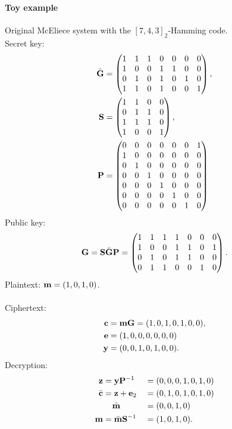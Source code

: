 \documentclass[a4paper, 11pt, openany]{book}
\numberwithin{equation}{section}
\theoremstyle{plain}
\theoremstyle{definition}
\begin{document}
\paragraph{Toy example}
Original McEliece system with the $[7,4,3]_2$-Hamming code.\\
Secret key:
\begin{align*}
	\bar{\bf G} &= \begin{pmatrix}
		1 & 1 & 1 & 0 & 0 & 0 & 0\\
		1 & 0 & 0 & 1 & 1 & 0 & 0\\
		0 & 1 & 0 & 1 & 0 & 1 & 0\\
		1 & 1 & 0 & 1 & 0 & 0 & 1\\
		\end{pmatrix},\\
	{\bf S} &= \begin{pmatrix}
	1 & 1 & 0 & 0\\
	0 & 1 & 1 & 0\\
	1 & 1 & 1 & 0\\
	1 & 0 & 0 & 1
	\end{pmatrix},\\
	{\bf P} &= \begin{pmatrix}
	0 & 0 & 0 & 0 & 0 & 0 & 1\\
	1 & 0 & 0 & 0 & 0 & 0 & 0\\
	0 & 1 & 0 & 0 & 0 & 0 & 0\\
	0 & 0 & 1 & 0 & 0 & 0 & 0\\
	0 & 0 & 0 & 1 & 0 & 0 & 0\\
	0 & 0 & 0 & 0 & 1 & 0 & 0\\
	0 & 0 & 0 & 0 & 0 & 1 & 0
	\end{pmatrix}
\end{align*}
Public key:
\[
	{\bf G} = {\bf S} \bar{\bf G} {\bf P} = 
	\begin{pmatrix}
	1 & 1 & 1 & 1 & 0 & 0 & 0\\
	1 & 0 & 0 & 1 & 1 & 0 & 1\\
	0 & 1 & 0 & 1 & 1 & 0 & 0\\
	0 & 1 & 1 & 0 & 0 & 1 & 0
	\end{pmatrix}.
\]
Plaintext: ${\bf m} = (1,0,1,0)$.\\
~\\
Ciphertext:
\begin{align*}
	{\bf c} &= {\bf m} {\bf G} = (1,0,1,0,1,0,0),\\
	{\bf e} &= (1,0,0,0,0,0,0)\\
	{\bf y} &= (0,0,1,0,1,0,0).
\end{align*}
Decryption:
\begin{alignat*}{2}
	{\bf z} &= {\bf y} {\bf P}^{-1} &&= (0,0,0,1,0,1,0)\\
	\bar{\bf c} &= {\bf z} + {\bf e}_2 	&&= (0,1,0,1,0,1,0)\\
	& \phantom{ = } \ \bar{\bf m} &&= (0,0,1,0) \\
	{\bf m} &= \bar{\bf m} {\bf S}^{-1} &&= (1,0,1,0).
\end{alignat*}
\end{document}

